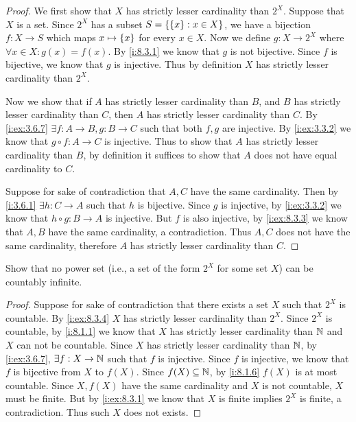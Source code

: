 \begin{proof}
  We first show that \(X\) has strictly lesser cardinality than \(2^X\).
  Suppose that \(X\) is a set.
  Since \(2^X\) has a subset \(S = \left\lbrace\left\lbrace x\right\rbrace : x \in X\right\rbrace\), we have a bijection \(f : X \to S\) which maps \(x \mapsto \left\lbrace x\right\rbrace\) for every \(x \in X\).
  Now we define \(g : X \to 2^X\) where \(\forall x \in X : g(x) = f(x)\).
  By \cref{i:8.3.1} we know that \(g\) is not bijective.
  Since \(f\) is bijective, we know that \(g\) is injective.
  Thus by definition \(X\) has strictly lesser cardinality than \(2^X\).

  Now we show that if \(A\) has strictly lesser cardinality than \(B\), and \(B\) has strictly lesser cardinality than \(C\), then \(A\) has strictly lesser cardinality than \(C\).
  By \cref{i:ex:3.6.7} \(\exists f : A \to B, g : B \to C\) such that both \(f, g\) are injective.
  By \cref{i:ex:3.3.2} we know that \(g \circ f : A \to C\) is injective.
  Thus to show that \(A\) has strictly lesser cardinality than \(B\), by definition it suffices to show that \(A\) does not have equal cardinality to \(C\).

  Suppose for sake of contradiction that \(A, C\) have the same cardinality.
  Then by \cref{i:3.6.1} \(\exists h : C \to A\) such that \(h\) is bijective.
  Since \(g\) is injective, by \cref{i:ex:3.3.2} we know that \(h \circ g : B \to A\) is injective.
  But \(f\) is also injective, by \cref{i:ex:8.3.3} we know that \(A, B\) have the same cardinality, a contradiction.
  Thus \(A, C\) does not have the same cardinality, therefore \(A\) has strictly lesser cardinality than \(C\).
\end{proof}

\begin{ex}\label{i:ex:8.3.5}
  Show that no power set (i.e., a set of the form \(2^X\) for some set \(X\)) can be countably infinite.
\end{ex}

\begin{proof}
  Suppose for sake of contradiction that there exists a set \(X\) such that \(2^X\) is countable.
  By \cref{i:ex:8.3.4} \(X\) has strictly lesser cardinality than \(2^X\).
  Since \(2^X\) is countable, by \cref{i:8.1.1} we know that \(X\) has strictly lesser cardinality than \(\mathbb{N}\) and \(X\) can not be countable.
  Since \(X\) has strictly lesser cardinality than \(\mathbb{N}\), by \cref{i:ex:3.6.7}, \(\exists f : X \to \mathbb{N}\) such that \(f\) is injective.
  Since \(f\) is injective, we know that \(f\) is bijective from \(X\) to \(f(X)\).
  Since \(f(X) \subseteq \mathbb{N}\), by \cref{i:8.1.6} \(f(X)\) is at most countable.
  Since \(X, f(X)\) have the same cardinality and \(X\) is not countable, \(X\) must be finite.
  But by \cref{i:ex:8.3.1} we know that \(X\) is finite implies \(2^X\) is finite, a contradiction.
  Thus such \(X\) does not exists.
\end{proof}
